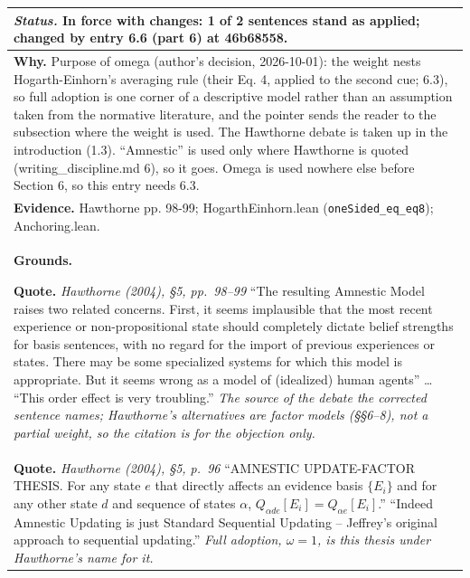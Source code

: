 \documentclass[10pt]{article}
\theoremstyle{definition}
\newlength{\fullw}\setlength{\fullw}{25.9cm}
\begin{document}
{\begin{longtable}{|p{0.9cm}|p{12.2cm}|p{12.2cm}|}
\multicolumn{3}{|p{\fullw}|}{\textit{Status.} In force with changes: 1 of 2 sentences stand as applied; changed by entry 6.6 (part 6) at 46b68558.} \\ \hline
\multicolumn{3}{|p{\fullw}|}{\textbf{Why.} Purpose of omega (author's decision, 2026-10-01): the weight nests Hogarth-Einhorn's averaging rule (their Eq. 4, applied to the second cue; 6.3), so full adoption is one corner of a descriptive model rather than an assumption taken from the normative literature, and the pointer sends the reader to the subsection where the weight is used. The Hawthorne debate is taken up in the introduction (1.3). ``Amnestic'' is used only where Hawthorne is quoted (writing\_discipline.md 6), so it goes. Omega is used nowhere else before Section 6, so this entry needs 6.3.} \\
\multicolumn{3}{|p{\fullw}|}{\textbf{Evidence.} Hawthorne pp. 98-99; HogarthEinhorn.lean (\texttt{oneSided\_eq\_eq8}); Anchoring.lean.} \\ \hline
\multicolumn{3}{|p{\fullw}|}{\textbf{Grounds.}\par \textbf{Quote.} \textit{Hawthorne (2004), \S5, pp.~98--99} \newline ``The resulting Amnestic Model raises two related concerns. First, it seems
implausible that the most recent experience or non-propositional state should completely
dictate belief strengths for basis sentences, with no regard for the import of previous
experiences or states. There may be some specialized systems for which this model is
appropriate. But it seems wrong as a model of (idealized) human agents'' \ldots
``This order effect is very troubling.'' \newline \textit{The source of the debate the corrected sentence names; Hawthorne's alternatives are factor models (\S\S6--8), not a partial weight, so the citation is for the objection only.}} \\
\multicolumn{3}{|p{\fullw}|}{\textbf{Quote.} \textit{Hawthorne (2004), \S5, p.~96} \newline ``AMNESTIC UPDATE-FACTOR THESIS. For any state $e$ that directly affects an evidence
basis $\{E_i\}$ and for any other state $d$ and sequence of states $\alpha$,
$Q_{\alpha de}[E_i]=Q_{\alpha e}[E_i]$.'' ``Indeed Amnestic Updating is just Standard
Sequential Updating -- Jeffrey's original approach to sequential updating.'' \newline \textit{Full adoption, $\omega=1$, is this thesis under Hawthorne's name for it.}} \\ \hline

\end{longtable}}
\end{document}
